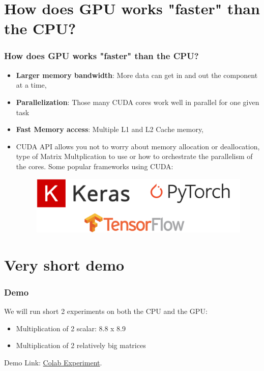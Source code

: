 \documentclass[11pt]{beamer}
\begin{document}
\section{How does GPU works "faster" than the CPU?}
\begin{frame}
	\frametitle{How does GPU works "faster" than the CPU?}
	\begin{itemize}
		\item \textbf{Larger memory bandwidth}: More data can get in and out the component at a time,
		\item \textbf{Parallelization}: Those many CUDA cores work well in parallel for one given task
		\item \textbf{Fast Memory access}: Multiple L1 and L2 Cache memory,
		\item CUDA API allows you not to worry about memory allocation or deallocation, type of Matrix Multplication to use or how to orchestrate the parallelism of the cores. Some popular frameworks using CUDA:
			 \begin{figure}
			\includegraphics[width=\textwidth,height=\textheight,keepaspectratio]{dl_frameworks}
		\end{figure}
	\end{itemize}
\end{frame}

\section{Very short demo}
\begin{frame}[fragile]
	\frametitle{Demo}
	
	We will run short 2 experiments on both the CPU and the GPU:
	\begin{itemize}
		\item Multiplication of 2 scalar: 8.8 x 8.9
		\item Multiplication of 2 relatively big matrices
	\end{itemize}
	
		\centering
	Demo Link: 
\href{https://colab.research.google.com/drive/1q32stN5vWQ3XApmu58BczJJy62wTI3Zf#scrollTo=UjuLyp2wMK7D}{Colab Experiment}.
\end{frame}
\end{document}
